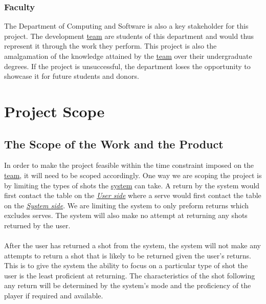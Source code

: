 \documentclass[11pt]{article}
\begin{document}
\subsubsection{Faculty}
The Department of Computing and Software is also a key stakeholder for this project. The development \hyperref[sec:definitions]{team} are students of this department and would thus represent it through the work they perform. This project is also the amalgamation of the knowledge attained by the \hyperref[sec:definitions]{team} over their undergraduate degrees. If the project is unsuccessful, the department loses the opportunity to showcase it for future students and donors.

\section{Project Scope}
\subsection{The Scope of the Work and the Product}
In order to make the project feasible within the time constraint imposed on the \hyperref[sec:definitions]{team}, it will need to be scoped accordingly. One way we are scoping the project is by limiting the types of shots the \hyperref[sec:definitions]{system} can take. A return by the system would first contact the table on the \hyperref[sec:definitions]{\textit{User side}} where a serve would first contact the table on the \hyperref[sec:definitions]{\textit{System side}}. We are limiting the system to only preform returns which excludes serves. The system will also make no attempt at returning any shots returned by the user. \\\\
After the user has returned a shot from the system, the system will not make any attempts to return a shot that is likely to be returned given the user's returns. This is to give the system the ability to focus on a particular type of shot the user is the least proficient at returning. The characteristics of the shot following any return will be determined by the system's mode and the proficiency of the player if required and available.
\end{document}
